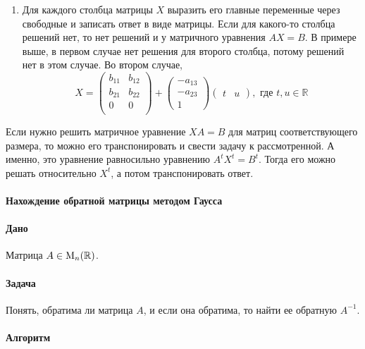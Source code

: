 \begin{enumerate}
\item Для каждого столбца матрицы $X$ выразить его главные переменные через свободные и записать ответ в виде матрицы.
Если для какого-то столбца решений  нет, то нет решений и у матричного уравнения $AX = B$.
В примере выше, в первом случае нет решения для второго столбца, потому решений нет в этом случае.
Во втором случае, 
\[
X = 
\begin{pmatrix}
{b_{11}}&{b_{12}}\\
{b_{21}}&{b_{22}}\\
{0}&{0}\\
\end{pmatrix}
+
\begin{pmatrix}
{-a_{13}}\\{-a_{23}}\\{1}
\end{pmatrix}
\begin{pmatrix}
{t}&{u}
\end{pmatrix},\text{ где } t,u\in \mathbb R
\]
\end{enumerate}

Если нужно решить матричное уравнение $XA = B$ для матриц соответствующего размера, то можно его транспонировать и свести задачу к рассмотренной.
А именно, это уравнение равносильно уравнению $A^t X^t = B^t$.
Тогда его можно решать относительно $X^t$, а потом транспонировать ответ.

\paragraph{Нахождение обратной матрицы методом Гаусса}

\paragraph{Дано}

Матрица $A\in \operatorname{M}_{n}(\mathbb R)$.

\paragraph{Задача}

Понять, обратима ли матрица $A$, и если она обратима, то найти ее обратную $A^{-1}$.

\paragraph{Алгоритм} 

